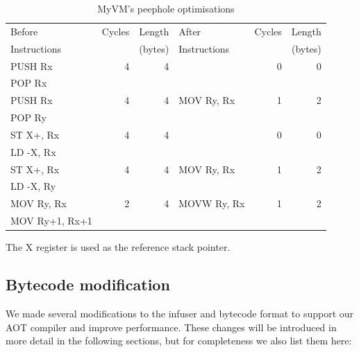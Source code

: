 \begin{table}
\caption{MyVM's peephole optimisations}
\label{tbl-myvm-peephole}
    \begin{threeparttable}
    \begin{tabular}{lrrlrr}
    \toprule
    Before         & Cycles & Length  & After        & Cycles & Length \\
    Instructions   &        & (bytes) & Instructions &        & (bytes) \\
    \midrule
    \midrule
    PUSH Rx        & 4      & 4       &              & 0      & 0 \\
    POP Rx         &        &         &              &        & \\
    \midrule
    PUSH Rx        & 4      & 4       & MOV Ry, Rx   & 1      & 2 \\
    POP Ry         &        &         &              &        & \\
    \midrule
    ST X+, Rx      & 4      & 4       &              & 0      & 0 \\
    LD -X, Rx      &        &         &              &        & \\
    \midrule
    ST X+, Rx      & 4      & 4       & MOV Ry, Rx   & 1      & 2 \\
    LD -X, Ry      &        &         &              &        & \\
    \midrule
    MOV Ry, Rx     & 2      & 4       & MOVW Ry, Rx  & 1      & 2 \\
    MOV Ry+1, Rx+1 &        &         &              &        & \\
    \bottomrule
    \end{tabular}
    \begin{tablenotes}
    \item The X register is used as the reference stack pointer.
    \end{tablenotes}
    \end{threeparttable}
\end{table}


\subsection{Bytecode modification}
\label{sec-vm-design-bytecode-modifications}
We made several modifications to the infuser and bytecode format to support our AOT compiler and improve performance. These changes will be introduced in more detail in the following sections, but for completeness we also list them here:

